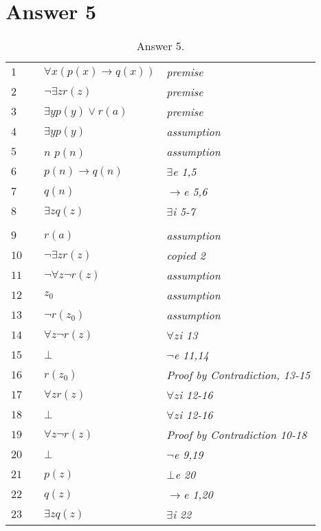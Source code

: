 \documentclass[12pt]{article}
\begin{document}
\section*{Answer 5}
\begin{table}[H]
	\centering
	\caption{Answer 5.}
	\begin{tabular}{*4{l}}
		$1$ & & $\forall x(p(x) \rightarrow q(x))$ & \textit{premise} \\ 
		$2$ & & $\neg \exists z r(z)$ & \textit{premise}\\
		$3$ & & $ \exists y p(y) \vee r(a) $ & \textit{premise}\\
		
		\hline \hline     %
		
		$4$ & & $\exists y p(y)$ & \textit{assumption} \\
		\hline

		$5$ & & $n$ $p(n)$ & \textit{assumption}\\ 
		
		$6$ & & $p(n) \rightarrow q(n)$ & \textit{$\exists$e 1,5}\\
		
		$7$ & & $q(n)$ & \textit{$\rightarrow$e 5,6}\\ 
		
		\hline
		
		$8$ & & $\exists z q(z)$ & \textit{$\exists$i 5-7}\\ 
		\hline \hline
		\\		
		
		\hline \hline \hline \hline
		$9$ & & $r(a)$ & \textit{assumption} \\  
		$10$ & & $\neg \exists z r(z)$ & \textit{copied 2} \\  
		
		\hline \hline \hline
		
		$11$ & & $\neg \forall z \neg r(z)$ & \textit{assumption} \\  
		
		\hline \hline 
		$12$ & & $z_0$ & \textit{assumption} \\ 
		\hline
		$13$ & & $\neg r(z_0)$ & \textit{assumption} \\
		$14$ & & $\forall z \neg r(z)$ & \textit{$\forall z$i 13} \\
		$15$ & & $\bot$ & \textit{$\neg$e 11,14} \\
		\hline
		$16$ & & $r(z_0)$ & \textit{Proof by Contradiction, 13-15} \\
		\hline \hline
		$17$ & & $\forall z r(z)$ & \textit{$\forall z$i 12-16} \\
		$18$ & & $\bot$ & \textit{$\forall z$i 12-16} \\
		\hline \hline \hline
		$19$ & & $\forall z \neg r(z)$ & \textit{Proof by Contradiction 10-18} \\
		$20$ & & $\bot$ & \textit{$\neg$e 9,19} \\
		\hline \hline \hline \hline
		$21$ & & $p(z)$ & \textit{$\bot$e 20} \\
		$22$ & & $q(z)$ & \textit{$\rightarrow$e 1,20} \\
		$23$ & & $\exists zq(z)$ & \textit{$\exists$i 22} \\
		
	\end{tabular}
\end{table}
\end{document}
